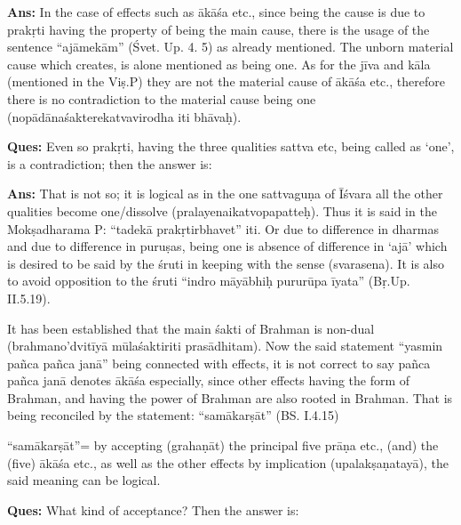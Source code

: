 
\textbf{Ans:} In the case of effects such as ākāśa etc., since being the cause is due to prakṛti having the property of being the main cause, there is the usage of the sentence “ajāmekām” (Śvet. Up. 4. 5) as already mentioned. The unborn material cause which creates, is alone mentioned as being one. As for the jīva and kāla (mentioned in the Viṣ.P) they are not the material cause of ākāśa etc., therefore there is no contradiction to the material cause being one (nopādānaśakterekatvavirodha iti bhāvaḥ).

\textbf{Ques:} Even so prakṛti, having the three qualities sattva etc, being called as ‘one’, is a contradiction; then the answer is:

\textbf{Ans:} That is not so; it is logical as in the one sattvaguṇa of Īśvara all the other qualities become one/dissolve (pralayenaikatvopapatteḥ). Thus it is said in the Mokṣadharama P: “tadekā prakṛtirbhavet” iti. Or due to difference in dharmas and due to difference in puruṣas, being one is absence of difference in ‘ajā’ which is desired to be said by the śruti in keeping with the sense (svarasena). It is also to avoid opposition to the śruti “indro māyābhiḥ pururūpa īyata” (Bṛ.Up. II.5.19). 

It has been established that the main śakti of Brahman is non-dual (brahmano’dvitīyā mūlaśaktiriti prasādhitam). Now the said statement “yasmin pañca pañca janā” being connected with effects, it is not correct to say pañca pañca janā denotes ākāśa especially, since other effects having the form of Brahman, and having the power of Brahman are also rooted in Brahman. That is being reconciled by the statement: “samākarṣāt” (BS. I.4.15)

\textbf{}



“samākarṣāt”= by accepting (grahaṇāt) the principal five prāṇa etc., (and) the (five) ākāśa etc., as well as the other effects by implication (upalakṣaṇatayā), the said meaning can be logical. 

\textbf{Ques:} What kind of acceptance? Then the answer is:

